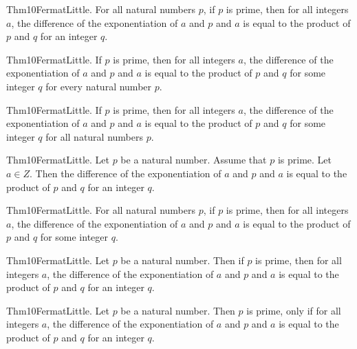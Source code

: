 \documentclass{article}
\begin{document}
Thm10FermatLittle. For all natural numbers $p$, if $p$ is prime, then for all integers $a$, the difference of the exponentiation of $a$ and $p$ and $a$ is equal to the product of $p$ and $q$ for an integer $q$.

Thm10FermatLittle. If $p$ is prime, then for all integers $a$, the difference of the exponentiation of $a$ and $p$ and $a$ is equal to the product of $p$ and $q$ for some integer $q$ for every natural number $p$.

Thm10FermatLittle. If $p$ is prime, then for all integers $a$, the difference of the exponentiation of $a$ and $p$ and $a$ is equal to the product of $p$ and $q$ for some integer $q$ for all natural numbers $p$.

Thm10FermatLittle. Let $p$ be a natural number. Assume that $p$ is prime. Let $a \in Z$. Then the difference of the exponentiation of $a$ and $p$ and $a$ is equal to the product of $p$ and $q$ for an integer $q$.

Thm10FermatLittle. For all natural numbers $p$, if $p$ is prime, then for all integers $a$, the difference of the exponentiation of $a$ and $p$ and $a$ is equal to the product of $p$ and $q$ for some integer $q$.

Thm10FermatLittle. Let $p$ be a natural number. Then if $p$ is prime, then for all integers $a$, the difference of the exponentiation of $a$ and $p$ and $a$ is equal to the product of $p$ and $q$ for an integer $q$.

Thm10FermatLittle. Let $p$ be a natural number. Then $p$ is prime, only if for all integers $a$, the difference of the exponentiation of $a$ and $p$ and $a$ is equal to the product of $p$ and $q$ for an integer $q$.
\end{document}

